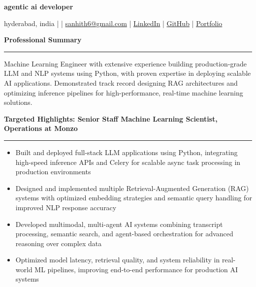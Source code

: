 \documentclass[9pt, letterpaper]{article}
\newcommand{\name}[1]{%
    \begin{center}
        {\LARGE \textbf{#1}}
    \end{center}
}
\newcommand{\sectionheading}[1]{%
    \vspace{4pt}%
    {\large \textbf{#1}}%
    \vspace{1pt}%
    \hrule
    \vspace{2pt}%
}
\begin{document}
\name{agentic ai developer}
\begin{center}
    hyderabad, india \quad |  \quad | \quad
    \href{mailto:sanhith6@gmail.com}{sanhith6@gmail.com} \quad | \quad
    \href{https://www.linkedin.com/in/sanhith-reddy-740a1625b/}{LinkedIn} \quad | \quad
    \href{https://github.com/tsanhith}{GitHub} \quad | \quad
    \href{https://johndoe.dev}{Portfolio}
\end{center}

\vspace{0pt}

\sectionheading{Professional Summary}
Machine Learning Engineer with extensive experience building production-grade LLM and NLP systems using Python, with proven expertise in deploying scalable AI applications. Demonstrated track record designing RAG architectures and optimizing inference pipelines for high-performance, real-time machine learning solutions.

\sectionheading{Targeted Highlights: Senior Staff Machine Learning Scientist, Operations at Monzo}
\begin{itemize}[leftmargin=0.25in, itemindent=-0.15in, label={--}]
    \item Built and deployed full-stack LLM applications using Python, integrating high-speed inference APIs and Celery for scalable async task processing in production environments
    \item Designed and implemented multiple Retrieval-Augmented Generation (RAG) systems with optimized embedding strategies and semantic query handling for improved NLP response accuracy
    \item Developed multimodal, multi-agent AI systems combining transcript processing, semantic search, and agent-based orchestration for advanced reasoning over complex data
    \item Optimized model latency, retrieval quality, and system reliability in real-world ML pipelines, improving end-to-end performance for production AI systems
\end{itemize}
\end{document}
